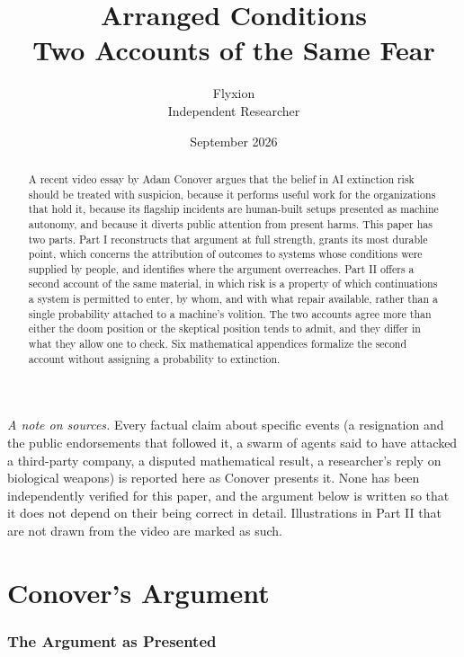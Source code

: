 \documentclass[11pt]{article}
\title{\textbf{Arranged Conditions}\\[0.4em]\large Two Accounts of the Same Fear}
\author{Flyxion\\ \small Independent Researcher}
\date{September 2026}
\theoremstyle{definition}
\begin{document}
\maketitle

\begin{abstract}
\noindent A recent video essay by Adam Conover argues that the belief in AI extinction risk should be treated with suspicion, because it performs useful work for the organizations that hold it, because its flagship incidents are human-built setups presented as machine autonomy, and because it diverts public attention from present harms. This paper has two parts. Part I reconstructs that argument at full strength, grants its most durable point, which concerns the attribution of outcomes to systems whose conditions were supplied by people, and identifies where the argument overreaches. Part II offers a second account of the same material, in which risk is a property of which continuations a system is permitted to enter, by whom, and with what repair available, rather than a single probability attached to a machine's volition. The two accounts agree more than either the doom position or the skeptical position tends to admit, and they differ in what they allow one to check.
 Six mathematical appendices formalize the second account without assigning a probability to extinction.
\end{abstract}

\vspace{0.5em}
\noindent\textit{A note on sources.} Every factual claim about specific events (a resignation and the public endorsements that followed it, a swarm of agents said to have attacked a third-party company, a disputed mathematical result, a researcher's reply on biological weapons) is reported here as Conover presents it. None has been independently verified for this paper, and the argument below is written so that it does not depend on their being correct in detail. Illustrations in Part II that are not drawn from the video are marked as such.

\part{Conover's Argument}

\section{The Argument as Presented}
\end{document}
